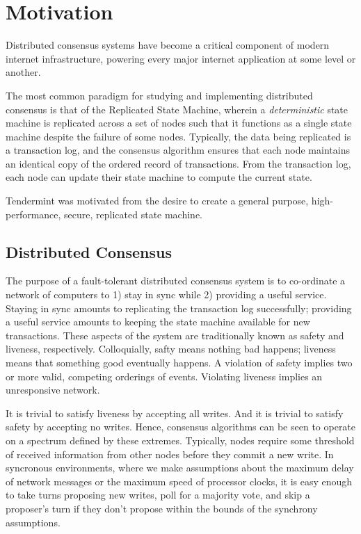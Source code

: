 \chapter{Motivation}
\label{ch:motivation}

Distributed consensus systems have become a critical component of modern internet infrastructure, powering every major internet application at some level or another.

The most common paradigm for studying and implementing distributed consensus is that of the Replicated State Machine, 
wherein a \emph{deterministic} state machine is replicated across a set of nodes such that it functions as a single state machine despite the failure of some nodes.
Typically, the data being replicated is a transaction log, and the consensus algorithm ensures that each node maintains an identical copy of 
the ordered record of transactions.
From the transaction log, each node can update their state machine to compute the current state.

Tendermint was motivated from the desire to create a general purpose, high-performance, secure, replicated state machine.


\section{Distributed Consensus}

The purpose of a fault-tolerant distributed consensus system is to co-ordinate a network of computers to 1) stay in sync while 2) providing a useful service.
Staying in sync amounts to replicating the transaction log successfully; providing a useful service amounts to keeping the state machine available for new transactions.
These aspects of the system are traditionally known as safety and liveness, respectively.
Colloquially, safty means nothing bad happens; liveness means that something good eventually happens.
A violation of safety implies two or more valid, competing orderings of events.
Violating liveness implies an unresponsive network.

It is trivial to satisfy liveness by accepting all writes. And it is trivial to satisfy safety by accepting no writes.
Hence, consensus algorithms can be seen to operate on a spectrum defined by these extremes.
Typically, nodes require some threshold of received information from other nodes before they commit a new write.
In syncronous environments, where we make assumptions about the maximum delay of network messages or the maximum speed of processor clocks,
 it is easy enough to take turns proposing new writes, poll for a majority vote, 
and skip a proposer's turn if they don't propose within the bounds of the synchrony assumptions.

